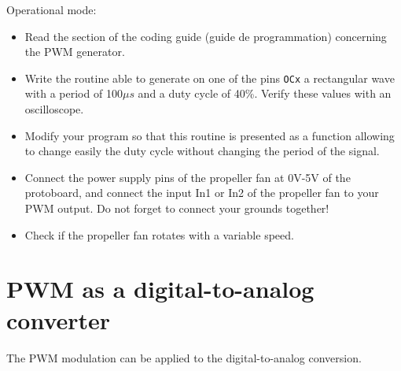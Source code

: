 \documentclass[11pt,a4paper]{article}
\theoremstyle{definition}%
\begin{document}
Operational mode:
\begin{itemize}
	\item Read the section of the coding guide (guide de programmation) concerning the PWM generator.
	\item Write the routine able to generate on one of the pins \texttt{OCx} a rectangular wave with a period of 100$\mu s$ and a duty cycle of 40\%.
	Verify these values with an oscilloscope.
	\item Modify your program so that this routine is presented as a function allowing to change easily the duty cycle without changing the period of the signal.
	\item Connect the power supply pins of the propeller fan at 0V-5V of the protoboard, and connect the input In1 or In2 of the propeller fan to your PWM output.
	Do not forget to connect your grounds together!
	\item Check if the propeller fan rotates with a variable speed.
\end{itemize}







\section{PWM as a digital-to-analog converter}
The PWM modulation can be applied to the digital-to-analog conversion.
\end{document}
